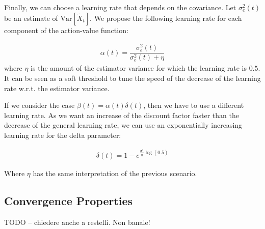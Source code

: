\documentclass[conference]{IEEEtran}
\begin{document}
Finally, we can choose a learning rate that depends on the covariance. Let $\sigma_e^2(t)$ be an estimate of $\mathrm{Var}\left[\widetilde{X}_{t}\right]$. We propose the following learning rate for each component of the action-value function:

\begin{align}
 \alpha(t)=\dfrac{\sigma_e^2(t)}{\sigma_e^2(t)+\eta}
\end{align}
where $\eta$ is the amount of the estimator variance for which the learning rate is $0.5$. It can be seen as a soft threshold to tune the speed of the decrease of the learning rate w.r.t. the estimator variance.

If we consider the case $\beta(t)=\alpha(t)\delta(t)$, then we have to use a different learning rate. As we want an increase of the discount factor faster than the decrease of the general learning rate, we can use an exponentially increasing learning rate for the delta parameter:

\begin{align}\label{eq:delta_eq}
 \delta(t) = 1- e^{\frac{\sigma^2}{\eta}\log(0.5)}
\end{align}

Where $\eta$ has the same interpretation of the previous scenario.

\subsection{Convergence Properties}

TODO -- chiedere anche a restelli. Non banale!
\end{document}
